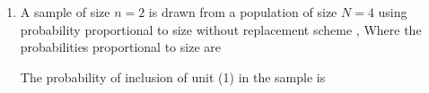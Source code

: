 \begin{enumerate}[label=\thesection.\arabic*.,ref=\thesection.\theenumi]
\begin{enumerate}
    \end{enumerate}    
%
\solution

%
%
\item A sample of size $n =2$ is drawn from a population of size $N=4$ using probability proportional to size without replacement scheme , Where the probabilities proportional to size are
\begin{table}[h!]
   \caption*{Table : Probability vs Size}
\end{table}  
The probability of inclusion of unit (1) in the sample is 
\begin{enumerate}
%


\end{enumerate}
\end{enumerate}
